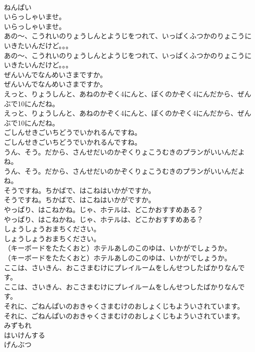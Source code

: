 \documentclass[8pt]{extreport}
\begin{document}
\begin{CJK}{UTF8}{min}
\\	ねんぱい
\\	いらっしゃいませ。　
\\	いらっしゃいませ。　
\\	あの～、こうれいのりょうしんとようじをつれて、いっぱくふつかのりょこうにいきたいんだけど。。。
\\	あの～、こうれいのりょうしんとようじをつれて、いっぱくふつかのりょこうにいきたいんだけど。。。
\\	ぜんいんでなんめいさまですか。
\\	ぜんいんでなんめいさまですか。
\\	えっと、りょうしんと、あねのかぞく4にんと、ぼくのかぞく4にんだから、ぜんぶで10にんだね。
\\	えっと、りょうしんと、あねのかぞく4にんと、ぼくのかぞく4にんだから、ぜんぶで10にんだね。
\\	ごしんせきごいちどうでいかれるんですね。
\\	ごしんせきごいちどうでいかれるんですね。
\\	うん、そう。だから、さんせだいのかぞくりょこうむきのプランがいいんだよね。
\\	うん、そう。だから、さんせだいのかぞくりょこうむきのプランがいいんだよね。
\\	そうですね。ちかばで、はこねはいかがですか。
\\	そうですね。ちかばで、はこねはいかがですか。
\\	やっぱり、はこねかね。じゃ、ホテルは、どこかおすすめある？
\\	やっぱり、はこねかね。じゃ、ホテルは、どこかおすすめある？
\\	しょうしょうおまちください。
\\	しょうしょうおまちください。
\\	（キーボードをたたくおと）ホテルあしのこのゆは、いかがでしょうか。
\\	（キーボードをたたくおと）ホテルあしのこのゆは、いかがでしょうか。
\\	ここは、さいきん、おこさまむけにプレイルームをしんせつしたばかりなんです。
\\	ここは、さいきん、おこさまむけにプレイルームをしんせつしたばかりなんです。
\\	それに、ごねんぱいのおきゃくさまむけのおしょくじもよういされています。
\\	それに、ごねんぱいのおきゃくさまむけのおしょくじもよういされています。
\\	みずもれ
\\	はいけんする
\\	げんぶつ

\end{CJK}
\end{document}
